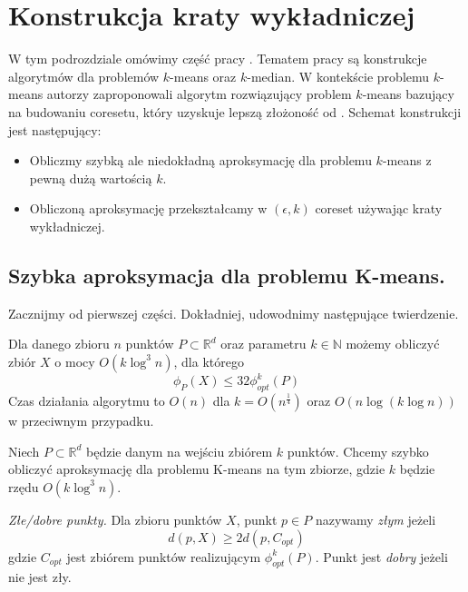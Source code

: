 \section{Konstrukcja kraty wykładniczej}

W tym podrozdziale omówimy część pracy \cite{10.1145/1007352.1007400}.
Tematem pracy są konstrukcje algorytmów dla problemów $k$-means oraz $k$-median.
W kontekście problemu $k$-means autorzy zaproponowali algorytm rozwiązujący problem $k$-means bazujący na budowaniu coresetu, który uzyskuje lepszą złożoność od \cite{Matousek99onapproximate}.
Schemat konstrukcji jest następujący:
\begin{itemize}
    \item Obliczmy szybką ale niedokładną aproksymację dla problemu $k$-means z pewną dużą wartością $k$.
    \item Obliczoną aproksymację przekształcamy w $(\epsilon, k)$ coreset używając kraty wykładniczej.
\end{itemize}


\subsection{Szybka aproksymacja dla problemu K-means.}
\noindent
Zacznijmy od pierwszej części.
Dokładniej, udowodnimy następujące twierdzenie.

\begin{thm}{\cite{10.1145/1007352.1007400}}
    Dla danego zbioru $n$ punktów $P \subset \mathbb{R}^d$ oraz parametru $k \in \mathbb{N}$ możemy 
    obliczyć zbiór $X$ o mocy $O(k \log^{3}n)$, dla którego 
    \begin{equation}
        \phi_{P}(X) \leq 32 \phi_{opt}^{k}(P)
    \end{equation}
    Czas działania algorytmu to $O(n)$ dla $k = O(n^{\frac{1}{4}})$ oraz $O(n \log (k \log n))$ w przeciwnym przypadku.
\end{thm}

\noindent
Niech $P \subset \mathbb{R}^{d}$ będzie danym na wejściu zbiórem $k$ punktów.
Chcemy szybko obliczyć aproksymację dla problemu K-means na tym zbiorze, gdzie $k$ będzie rzędu $O(k \log^{3}n)$.

\begin{definition}
    \emph{Złe/dobre punkty.} Dla zbioru punktów $X$, punkt $p \in P$ nazywamy \textit{złym} jeżeli
    \begin{equation}
        d(p, X) \geq 2d(p, C_{opt})
    \end{equation}
    gdzie $C_{opt}$ jest zbiórem punktów realizującym $\phi_{opt}^{k}(P)$.
    Punkt jest \textit{dobry} jeżeli nie jest zły.
\end{definition}

